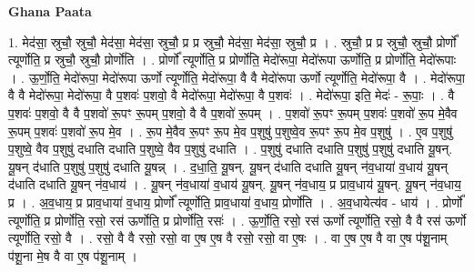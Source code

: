\documentclass[17pt]{extarticle}
\begin{document}
\textbf{Ghana Paata } \newline

1. मेद॑सा॒ स्रुचौ॒ स्रुचौ॒ मेद॑सा॒ मेद॑सा॒ स्रुचौ॒ प्र प्र स्रुचौ॒ मेद॑सा॒ मेद॑सा॒ स्रुचौ॒ प्र । . स्रुचौ॒ प्र प्र स्रुचौ॒ स्रुचौ॒ प्रोर्णो᳚ त्यूर्णोति॒ प्र स्रुचौ॒ स्रुचौ॒ प्रोर्णो॑ति । . प्रोर्णो᳚ त्यूर्णोति॒ प्र प्रोर्णो॑ति॒ मेदो॑रूपा॒ मेदो॑रूपा ऊर्णोति॒ प्र प्रोर्णो॑ति॒ मेदो॑रूपाः । . ऊ॒र्णो॒ति॒ मेदो॑रूपा॒ मेदो॑रूपा ऊर्णो त्यूर्णोति॒ मेदो॑रूपा॒ वै वै मेदो॑रूपा ऊर्णो त्यूर्णोति॒ मेदो॑रूपा॒ वै । . मेदो॑रूपा॒ वै वै मेदो॑रूपा॒ मेदो॑रूपा॒ वै प॒शवः॑ प॒शवो॒ वै मेदो॑रूपा॒ मेदो॑रूपा॒ वै प॒शवः॑ । . मेदो॑रूपा॒ इति॒ मेदः॑ - रू॒पाः॒ । . वै प॒शवः॑ प॒शवो॒ वै वै प॒शवो॑ रू॒पꣳ रू॒पम् प॒शवो॒ वै वै प॒शवो॑ रू॒पम् । . प॒शवो॑ रू॒पꣳ रू॒पम् प॒शवः॑ प॒शवो॑ रू॒प मे॒वैव रू॒पम् प॒शवः॑ प॒शवो॑ रू॒प मे॒व । . रू॒प मे॒वैव रू॒पꣳ रू॒प मे॒व प॒शुषु॑ प॒शुष्वे॒व रू॒पꣳ रू॒प मे॒व प॒शुषु॑ । . ए॒व प॒शुषु॑ प॒शुष्वे॒ वैव प॒शुषु॑ दधाति दधाति प॒शुष्वे॒ वैव प॒शुषु॑ दधाति । . प॒शुषु॑ दधाति दधाति प॒शुषु॑ प॒शुषु॑ दधाति यू॒षन्. यू॒षन् द॑धाति प॒शुषु॑ प॒शुषु॑ दधाति यू॒षन्न् । . द॒धा॒ति॒ यू॒षन्. यू॒षन् द॑धाति दधाति यू॒षन् न॑व॒धाया॑ व॒धाय॑ यू॒षन् द॑धाति दधाति यू॒षन् न॑व॒धाय॑ । . यू॒षन् न॑व॒धाया॑ व॒धाय॑ यू॒षन्. यू॒षन् न॑व॒धाय॒ प्र प्राव॒धाय॑ यू॒षन्. यू॒षन् न॑व॒धाय॒ प्र । . अ॒व॒धाय॒ प्र प्राव॒धाया॑ व॒धाय॒ प्रोर्णो᳚ त्यूर्णोति॒ प्राव॒धाया॑ व॒धाय॒ प्रोर्णो॑ति । . अ॒व॒धायेत्य॑व - धाय॑ । . प्रोर्णो᳚ त्यूर्णोति॒ प्र प्रोर्णो॑ति॒ रसो॒ रस॑ ऊर्णोति॒ प्र प्रोर्णो॑ति॒ रसः॑ । . ऊ॒र्णो॒ति॒ रसो॒ रस॑ ऊर्णो त्यूर्णोति॒ रसो॒ वै वै रस॑ ऊर्णो त्यूर्णोति॒ रसो॒ वै । . रसो॒ वै वै रसो॒ रसो॒ वा ए॒ष ए॒ष वै रसो॒ रसो॒ वा ए॒षः । . वा ए॒ष ए॒ष वै वा ए॒ष प॑शू॒नाम् प॑शू॒ना मे॒ष वै वा ए॒ष प॑शू॒नाम् । \newline
\end{document}
